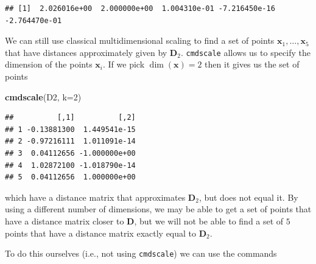 \documentclass[]{book}
\newenvironment{Shaded}{\begin{snugshade}}{\end{snugshade}}
\newcommand{\DataTypeTok}[1]{\textcolor[rgb]{0.13,0.29,0.53}{#1}}
\newcommand{\DecValTok}[1]{\textcolor[rgb]{0.00,0.00,0.81}{#1}}
\newcommand{\FloatTok}[1]{\textcolor[rgb]{0.00,0.00,0.81}{#1}}
\newcommand{\KeywordTok}[1]{\textcolor[rgb]{0.13,0.29,0.53}{\textbf{#1}}}
\newcommand{\NormalTok}[1]{#1}
\newcommand{\OperatorTok}[1]{\textcolor[rgb]{0.81,0.36,0.00}{\textbf{#1}}}
\newcommand{\StringTok}[1]{\textcolor[rgb]{0.31,0.60,0.02}{#1}}
\theoremstyle{definition}
\theoremstyle{definition}
\theoremstyle{definition}
\theoremstyle{remark}
\begin{document}
\begin{Shaded}
\end{Shaded}

\begin{verbatim}
## [1]  2.026016e+00  2.000000e+00  1.004310e-01 -7.216450e-16 -2.764470e-01
\end{verbatim}

We can still use classical multidimensional scaling to find a set of points \(\mathbf x_1, \ldots, \mathbf x_5\) that have distances approximately given by \(\mathbf D_2\).
\texttt{cmdscale} allows us to specify the dimension of the points \(\mathbf x_i\). If we pick \(\dim(\mathbf x)=2\) then it gives us the set of points

\begin{Shaded}
\begin{Highlighting}[]
\KeywordTok{cmdscale}\NormalTok{(D2, }\DataTypeTok{k=}\DecValTok{2}\NormalTok{)}
\end{Highlighting}
\end{Shaded}

\begin{verbatim}
##          [,1]          [,2]
## 1 -0.13881300  1.449541e-15
## 2 -0.97216111  1.011091e-14
## 3  0.04112656 -1.000000e+00
## 4  1.02872100 -1.018790e-14
## 5  0.04112656  1.000000e+00
\end{verbatim}

which have a distance matrix that approximates \(\mathbf D_2\), but does not equal it. By using a different number of dimensions, we may be able to get a set of points that have a distance matrix closer to \(\mathbf D\), but we will not be able to find a set of \(5\) points that have a distance matrix exactly equal to \(\mathbf D_2\).

To do this ourselves (i.e., not using \texttt{cmdscale}) we can use the commands
\end{document}
